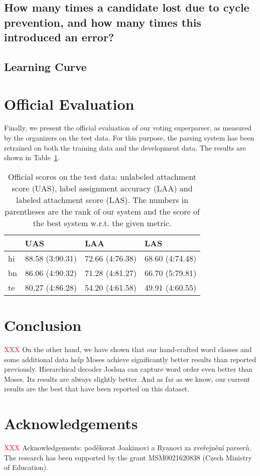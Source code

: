 \documentclass[11pt]{article}
\def\Tref#1{Table~\ref{#1}}
\newcommand{\XXX}{\textcolor{red}{XXX }} %
\begin{document}
\subsection{How many times a candidate lost due to cycle prevention, and how many times this introduced an error?}

\subsection{Learning Curve}

\section{Official Evaluation}
\label{sec:evaluation}

Finally, we present the official evaluation of our voting superparser, as measured by the organizers on the test data. For this purpose, the parsing system has been retrained on both the training data and the development data. The results are shown in \Tref{tab:evaluation}.

\begin{table}[ht]
\begin{centering}
\small
\begin{tabular}{l|l|l|l}
& \textbf{UAS} & \textbf{LAA} & \textbf{LAS} \\
\hline
hi & 88.58 (3:90.31) & 72.66 (4:76.38) & 68.60 (4:74.48)\\
bn & 86.06 (4:90.32) & 71.28 (4:81.27) & 66.70 (5:79.81)\\
te & 80.27 (4:86.28) & 54.20 (4:61.58) & 49.91 (4:60.55)\\
\end{tabular}
\caption{Official scores on the test data: unlabeled attachment score (UAS), label assignment accuracy (LAA) and labeled attachment score (LAS). The numbers in parentheses are the rank of our system and the score of the best system w.r.t. the given metric.}
\label{tab:evaluation}
\end{centering}
\end{table}

\section{Conclusion}
\label{sec:concl}

\XXX On the other hand, we have shown that our hand-crafted word classes and some
additional data help Moses achieve significantly better results than reported
previously. Hierarchical decoder Joshua can capture word order even better than
Moses. Its results are always slightly better. And as far as we know, our
current results are the best that have been reported on this dataset.

\section*{Acknowledgements}

\XXX Acknowledgements: poděkovat Joakimovi a Ryanovi za zveřejnění parserů.
The research has been supported by the grant 
MSM0021620838 (Czech Ministry of Education).

\begin{small}

\end{small}
\end{document}

